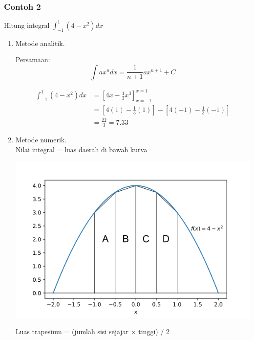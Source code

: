 \documentclass[pdflatex,compress]{beamer}
\begin{document}
\begin{frame}
	\frametitle{Contoh 2}

	Hitung integral $ \int_{-1}^{1} (4 - x^2) dx $
	
	\begin{enumerate}
		\item Metode analitik.
		
		Persamaan: 
		\begin{equation*}
			\int ax^n dx = \frac{1}{n+1}ax^{n+1} + C
		\end{equation*}
	
		\begin{align*}
			\int_{-1}^{1} (4 - x^2) dx &= \left[4x - \frac{1}{3}x^3\right]^{x=1}_{x=-1} \\
									   &=\left[ 4(1) - \frac{1}{3}(1) \right] - \left[ 4(-1) - \frac{1}{3}(-1) \right] \\
									   &= \frac{22}{3} = 7.33
		\end{align*}
	\end{enumerate}
	
\end{frame}

\begin{frame}
	\begin{enumerate}
		\setcounter{enumi}{1}
		\item Metode numerik. \\
		
		Nilai integral = luas daerah di bawah kurva
		
		\begin{center}
			\includegraphics[width=0.6\linewidth]{img/img003}
		\end{center}
	
		Luas trapesium = (jumlah sisi sejajar $\times$ tinggi) / 2
	\end{enumerate}
\end{frame}
\end{document}
